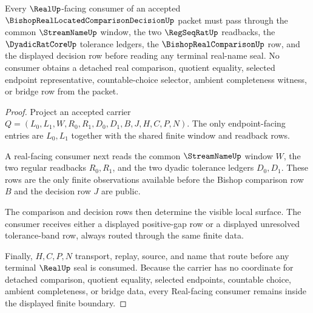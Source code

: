 \begin{theorem}
\label{thm:bishop-real-located-comparison-decision-real-seal-boundary}
Every $\RealUp$-facing consumer of an accepted $\BishopRealLocatedComparisonDecisionUp$ packet must pass through the common $\StreamNameUp$ window, the two $\RegSeqRatUp$ readbacks, the $\DyadicRatCoreUp$ tolerance ledgers, the $\BishopRealComparisonUp$ row, and the displayed decision row before reading any terminal real-name seal. No consumer obtains a detached real comparison, quotient equality, selected endpoint representative, countable-choice selector, ambient completeness witness, or bridge row from the packet.
\end{theorem}
\begin{proof}
Project an accepted carrier $Q=(L_0,L_1,W,R_0,R_1,D_0,D_1,B,J,H,C,P,N)$. The only endpoint-facing entries are $L_0,L_1$ together with the shared finite window and readback rows.

A real-facing consumer next reads the common $\StreamNameUp$ window $W$, the two regular readbacks $R_0,R_1$, and the two dyadic tolerance ledgers $D_0,D_1$. These rows are the only finite observations available before the Bishop comparison row $B$ and the decision row $J$ are public.

The comparison and decision rows then determine the visible local surface. The consumer receives either a displayed positive-gap row or a displayed unresolved tolerance-band row, always routed through the same finite data.

Finally, $H,C,P,N$ transport, replay, source, and name that route before any terminal $\RealUp$ seal is consumed. Because the carrier has no coordinate for detached comparison, quotient equality, selected endpoints, countable choice, ambient completeness, or bridge data, every Real-facing consumer remains inside the displayed finite boundary.
\end{proof}


